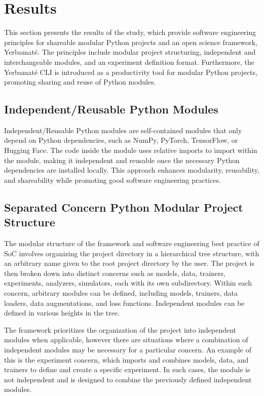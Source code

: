 \section{Results}

This section presents the results of the study, which provide software engineering principles for shareable modular Python projects and an open science framework, Yerbamaté. The principles include modular project structuring, independent and interchangeable modules, and an experiment definition format.  Furthermore, the Yerbamaté CLI is introduced as a productivity tool for modular Python projects, promoting sharing and reuse of Python modules.


\subsection{Independent/Reusable Python Modules}

Independent/Reusable Python modules are self-contained modules that only depend on Python dependencies, such as NumPy, PyTorch, TensorFlow, or Hugging Face. The code inside the module uses relative imports to import within the module, making it independent and reusable once the necessary Python dependencies are installed locally. This approach enhances modularity, reusability, and shareability while promoting good software engineering practices.



\subsection{Separated Concern Python Modular Project Structure}


 The modular structure of the framework and software engineering best practice of SoC involves organizing the project directory in a hierarchical tree structure, with an arbitrary name given to the root project directory by the user. The project is then broken down into distinct concerns such as models, data, trainers, experiments, analyzers, simulators, each with its own subdirectory. Within each concern, arbitrary modules can be defined, including models, trainers, data loaders, data augmentations, and loss functions. Independent modules can be defined in various heights in the tree.

The framework prioritizes the organization of the project into independent modules when applicable, however there are situations where a combination of independent modules may be necessary for a particular concern. An example of this is the experiment concern, which imports and combines models, data, and trainers to define and create a specific experiment. In such cases, the module is not independent and is designed to combine the previously defined independent modules. 


